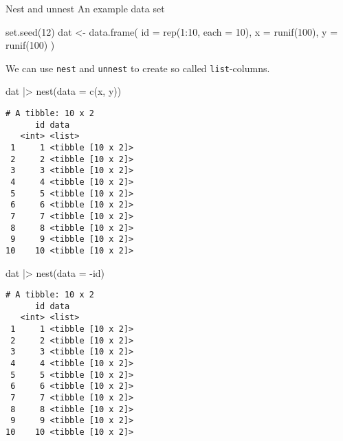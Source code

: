 \documentclass[ignorenonframetext,,t]{beamer}
\newenvironment{Shaded}{\begin{snugshade}}{\end{snugshade}}
\newcommand{\AttributeTok}[1]{\textcolor[rgb]{0.77,0.63,0.00}{#1}}
\newcommand{\DecValTok}[1]{\textcolor[rgb]{0.00,0.00,0.81}{#1}}
\newcommand{\FunctionTok}[1]{\textcolor[rgb]{0.00,0.00,0.00}{#1}}
\newcommand{\NormalTok}[1]{#1}
\newcommand{\OtherTok}[1]{\textcolor[rgb]{0.56,0.35,0.01}{#1}}
\newcommand{\SpecialCharTok}[1]{\textcolor[rgb]{0.00,0.00,0.00}{#1}}
\begin{document}
\begin{frame}[fragile]{Nest and unnest}
\protect\hypertarget{nest-and-unnest}{}
An example data set

\begin{Shaded}
\begin{Highlighting}[]
\FunctionTok{set.seed}\NormalTok{(}\DecValTok{12}\NormalTok{)}
\NormalTok{dat }\OtherTok{\textless{}{-}} \FunctionTok{data.frame}\NormalTok{(}
  \AttributeTok{id =} \FunctionTok{rep}\NormalTok{(}\DecValTok{1}\SpecialCharTok{:}\DecValTok{10}\NormalTok{, }\AttributeTok{each =} \DecValTok{10}\NormalTok{), }
  \AttributeTok{x =} \FunctionTok{runif}\NormalTok{(}\DecValTok{100}\NormalTok{), }
  \AttributeTok{y =} \FunctionTok{runif}\NormalTok{(}\DecValTok{100}\NormalTok{)}
\NormalTok{)}
\end{Highlighting}
\end{Shaded}
\end{frame}

\begin{frame}[fragile]
We can use \texttt{nest} and \texttt{unnest} to create so called
\texttt{list}-columns.

\begin{Shaded}
\begin{Highlighting}[]
\NormalTok{dat }\SpecialCharTok{|\textgreater{}} \FunctionTok{nest}\NormalTok{(}\AttributeTok{data =} \FunctionTok{c}\NormalTok{(x, y))}
\end{Highlighting}
\end{Shaded}

\begin{verbatim}
# A tibble: 10 x 2
      id data             
   <int> <list>           
 1     1 <tibble [10 x 2]>
 2     2 <tibble [10 x 2]>
 3     3 <tibble [10 x 2]>
 4     4 <tibble [10 x 2]>
 5     5 <tibble [10 x 2]>
 6     6 <tibble [10 x 2]>
 7     7 <tibble [10 x 2]>
 8     8 <tibble [10 x 2]>
 9     9 <tibble [10 x 2]>
10    10 <tibble [10 x 2]>
\end{verbatim}
\end{frame}

\begin{frame}[fragile]
\begin{Shaded}
\begin{Highlighting}[]
\NormalTok{dat }\SpecialCharTok{|\textgreater{}} \FunctionTok{nest}\NormalTok{(}\AttributeTok{data =} \SpecialCharTok{{-}}\NormalTok{id)}
\end{Highlighting}
\end{Shaded}

\begin{verbatim}
# A tibble: 10 x 2
      id data             
   <int> <list>           
 1     1 <tibble [10 x 2]>
 2     2 <tibble [10 x 2]>
 3     3 <tibble [10 x 2]>
 4     4 <tibble [10 x 2]>
 5     5 <tibble [10 x 2]>
 6     6 <tibble [10 x 2]>
 7     7 <tibble [10 x 2]>
 8     8 <tibble [10 x 2]>
 9     9 <tibble [10 x 2]>
10    10 <tibble [10 x 2]>
\end{verbatim}
\end{frame}
\end{document}
